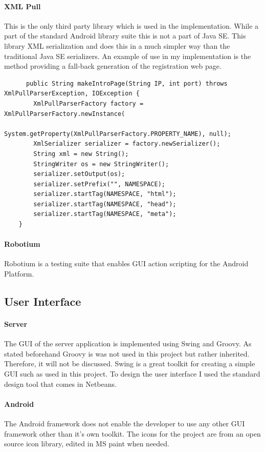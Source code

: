 \documentclass[11pt,twoside,a4paper]{book}
\begin{document}
\paragraph{XML Pull\cite{xmlpull}}
This is the only third party library which is used in the implementation. While a part of the standard Android library suite this is not a part of Java SE. This library XML serialization and does this in a much simpler way than the traditional Java SE serializers. An example of use in my implementation is the method providing a fall-back generation of the registration web page.\\
\begin{lstlisting}
      public String makeIntroPage(String IP, int port) throws XmlPullParserException, IOException {
        XmlPullParserFactory factory = XmlPullParserFactory.newInstance(
                System.getProperty(XmlPullParserFactory.PROPERTY_NAME), null);
        XmlSerializer serializer = factory.newSerializer();
        String xml = new String();
        StringWriter os = new StringWriter();
        serializer.setOutput(os);
        serializer.setPrefix("", NAMESPACE);
        serializer.startTag(NAMESPACE, "html");
        serializer.startTag(NAMESPACE, "head");
        serializer.startTag(NAMESPACE, "meta");
	}
\end{lstlisting}

\paragraph{Robotium\cite{robotium}}
Robotium is a testing suite that enables GUI action scripting for the Android Platform. 

\subsection{User Interface}
\paragraph{Server}
The GUI of the server application is implemented using Swing and Groovy. As stated beforehand Groovy is was not used in this project but rather inherited. Therefore, it will not be discussed. Swing is a great toolkit for creating a simple GUI such as used in this project. To design the user interface I used the standard design tool that comes in Netbeans.
\paragraph{Android}
The Android framework does not enable the developer to use any other GUI framework other than it's own toolkit. The icons for the project are from an open source icon library\cite{iconsource}, edited in MS paint when needed.
\end{document}
